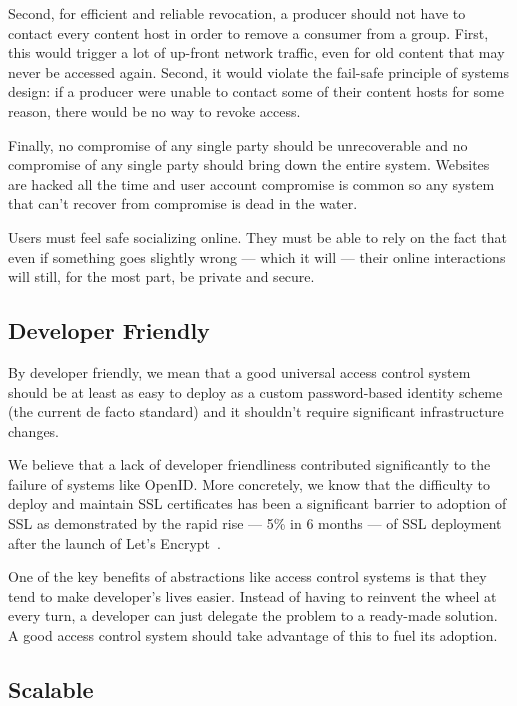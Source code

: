 \documentclass[pdftex,12pt,a4papaer,twoside,notitlepage]{report}
\begin{document}
Second, for efficient and reliable revocation, a producer should not have to
contact every content host in order to remove a consumer from a group. First,
this would trigger a lot of up-front network traffic, even for old content that
may never be accessed again. Second, it would violate the fail-safe principle of
systems design: if a producer were unable to contact some of their content hosts
for some reason, there would be no way to revoke access.

Finally, no compromise of any single party should be unrecoverable and no
compromise of any single party should bring down the entire system. Websites are
hacked all the time and user account compromise is common so any system that
can't recover from compromise is dead in the water.

Users must feel safe socializing online. They must be able to rely on the fact
that even if something goes slightly wrong --- which it will --- their online
interactions will still, for the most part, be private and secure.

\subsection{Developer Friendly}
\label{sec:goal-developer}

By developer friendly, we mean that a good universal access control system
should be at least as easy to deploy as a custom password-based identity scheme
(the current de facto standard) and it shouldn't require significant infrastructure
changes.

We believe that a lack of developer friendliness contributed significantly to
the failure of systems like OpenID\cite{openid}. More concretely, we know that
the difficulty to deploy and maintain SSL certificates has been a significant
barrier to adoption of SSL as demonstrated by the rapid rise --- 5\% in 6 months
--- of SSL deployment after the launch of Let's Encrypt~\cite{lets-encrypt}.

One of the key benefits of abstractions like access control systems is that they
tend to make developer's lives easier. Instead of having to reinvent the wheel
at every turn, a developer can just delegate the problem to a ready-made
solution. A good access control system should take advantage of this to fuel its
adoption.

\subsection{Scalable}
\end{document}
